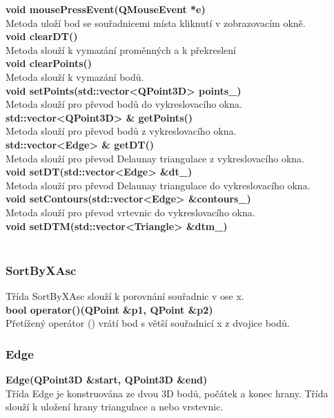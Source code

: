 \documentclass[a4paper, 12pt]{article}
\begin{document}
\textbf{void mousePressEvent(QMouseEvent *e)}\\
Metoda uloží bod se souřadnicemi místa kliknutí v zobrazovacím okně.
\\

\textbf{void clearDT()}\\
Metoda slouží k vymazání proměnných a k překreslení
\\

\textbf{void clearPoints()}\\
Metoda slouží k vymazání bodů.
\\

\textbf{void setPoints(std::vector<QPoint3D> points_)}\\
Metoda slouží pro převod bodů do vykreslovacího okna.\\

\textbf{std::vector<QPoint3D> & getPoints()}\\
Metoda slouží pro převod bodů z vykreslovacího okna.\\

\textbf{std::vector<Edge> & getDT()}\\
Metoda slouží pro převod Delaunay triangulace z vykreslovacího okna.\\

\textbf{void setDT(std::vector<Edge> &dt_)}\\
Metoda slouží pro převod Delaunay triangulace do vykreslovacího okna.\\

\textbf{void setContours(std::vector<Edge> &contours_)}\\
Metoda slouží pro převod vrtevnic do vykreslovacího okna.\\

\textbf{void setDTM(std::vector<Triangle> &dtm_)}\\
\\

\subsubsection{SortByXAsc}
Třída SortByXAsc slouží k porovnání souřadnic v ose x.\\


\textbf{bool operator()(QPoint \&p1, QPoint \&p2)}\\
Přetížený operátor () vrátí bod s větší souřadnicí x z dvojice bodů.\\

\subsubsection{Edge}
\textbf{Edge(QPoint3D &start, QPoint3D &end)}\\
Třída Edge je konstruována ze dvou 3D bodů, počátek a konec hrany. Třída slouží k uložení hrany triangulace a nebo vrstevnic.\\
    
\end{document}
